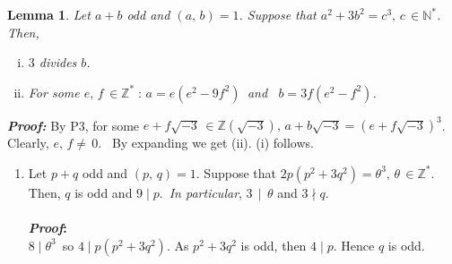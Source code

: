 \documentclass[11pt,a4paper]{article}
\newtheorem{lem}[thm]{Lemma}
\begin{document}
\begin{enumerate}
  $ $\\
       \begin{lem} Let $a+b$ odd and $(a,\,b)=1$. Suppose that $a^2+3b^2=c^3,\,c\,\in \mathbb{N}^*$. \,Then,
       \begin{enumerate}[(i)]
         \item $3$ divides $b$.
         \item For some $e,\,f\,\in \mathbb{Z}^*\;:\, a=e(e^2-9f^2)$\, and \, $b=3f(e^2-f^2)$.
       \end{enumerate}
       \end{lem}
       \textit{\textbf{Proof:}}\; By P3, for some $e+f\sqrt{-3}\,\in\mathbb{Z}(\sqrt{-3}),\, a+b\sqrt{-3}=(e+f\sqrt{-3})^3$.\\
       Clearly, $e,\, f\neq\,0.\, \,\,$ By expanding we get (ii). \hspace{.2cm} (i) follows.
  \begin{enumerate}[(P4)]
    \item Let $p+q$ odd and $(p,\,q)=1$. Suppose that $2p(p^2+3q^2)=\theta^3,\,\theta\,\in\mathbb{Z}^*$. \,Then, $q$ is odd and $9 \mid p.\,$ \textit{In particular}, $3\,\mid  \,\theta $ and $3\nmid q$.\\ \\
%
        \textbf{\textit{Proof}:}\\$8\mid \theta^3$\, so $4\mid p(p^2+3q^2)$. As $p^2+3q^2$ is odd, then $4\mid p$. Hence $q$ is odd.


\end{enumerate}
\end{enumerate}
\end{document}
